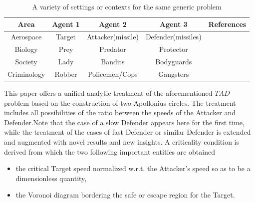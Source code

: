 \documentclass[final,5p,times,twocolumn]{elsarticle}
\begin{document}
\begin{table}[htb]
  \centering
  \caption{A variety of settings or contexts for the same generic problem}
\begin{tabular}{ |c||c|c|c|c| } 
\hline
Area & Agent 1 & Agent 2 & Agent 3 & References \\
 \hline
 \hline
 Aerospace & Target & Attacker(missile) & Defender(missiles) & \cite{pachter2014active,garcia2015active,garcia2015escape,garcia2014cooperative,garcia2015cooperative}\\
 \hline 
 Biology & Prey & Predator & Protector & \cite{de2010analysis,oyler2014pursuit}\\
 \hline 
 Society & Lady & Bandits & Bodyguards & \cite{rusnak2005lady}\\ 
 \hline
 Criminology & Robber & Policemen/Cops & Gangsters & \cite{cheung2007pursuit}\\ 
  \hline
\end{tabular}
\label{tableTAD}
\end{table}  

This paper offers a unified analytic treatment of the aforementioned $TAD$ problem based on the construction of two Apollonius circles.
The treatment includes all possibilities of the ratio between the speeds of the Attacker and Defender.Note that the case of a slow Defender appears here for the first time, while the treatment of the cases of fast Defender or similar Defender is extended and augmented with novel results and new insights. A criticality condition is derived from which the two following important entities are obtained
\begin{itemize}
\item the critical Target speed normalized w.r.t. the Attacker's speed so as to be a dimensionless quantity,
\item the Voronoi diagram bordering the safe or escape region for the Target.
\end{itemize}
\end{document}
